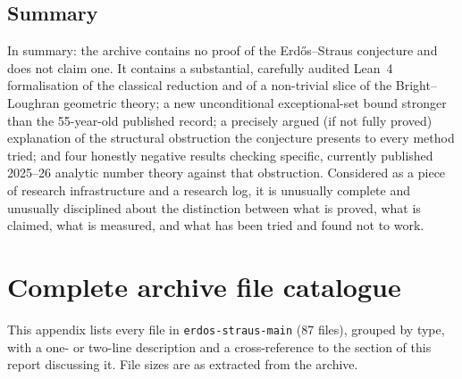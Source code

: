 \documentclass[11pt]{article}
\theoremstyle{plain}
\theoremstyle{definition}
\theoremstyle{remark}
\newcommand{\file}[1]{\texttt{#1}}
\renewcommand{\_}{\textunderscore\allowbreak}
\begin{document}
\subsection{Summary}

In summary: the archive contains no proof of the Erd\H{o}s--Straus conjecture and does not claim
one. It contains a substantial, carefully audited Lean~4 formalisation of the classical
reduction and of a non-trivial slice of the Bright--Loughran geometric theory; a new
unconditional exceptional-set bound stronger than the 55-year-old published record; a precisely
argued (if not fully proved) explanation of the structural obstruction the conjecture presents to
every method tried; and four honestly negative results checking specific, currently published
2025--26 analytic number theory against that obstruction. Considered as a piece of research
infrastructure and a research log, it is unusually complete and unusually disciplined about the
distinction between what is proved, what is claimed, what is measured, and what has been tried
and found not to work.


\appendix
\section{Complete archive file catalogue}
\label{app:files}

This appendix lists every file in \file{erdos-straus-main} (87 files), grouped by type, with a
one- or two-line description and a cross-reference to the section of this report discussing it.
File sizes are as extracted from the archive.
\end{document}
